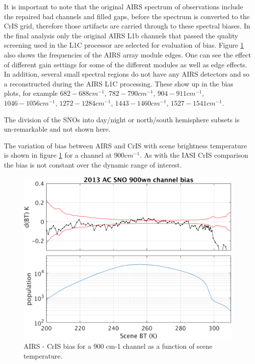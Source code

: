 \documentclass[11pt]{article}
\begin{document}


It is important to note that the original AIRS spectrum of observations include the repaired bad channels and filled gaps, before the spectrum is converted to the CrIS grid, therefore those artifacts are carried through to these spectral biases. In the final analysis only the original AIRS L1b channels that passed the quality screening used in the L1C processor are selected for evaluation of bias. Figure \ref{fig:Y6} also shows the frequencies of the AIRS array module edges. One can see the effect of different gain settings for some of the different modules as well as edge effects. In addition, several small spectral regions do not have any AIRS detectors and so a reconstructed during the AIRS L1C processing. These show up in the bias plots, for example $ 682 - 688 cm^{-1} $, $ 782 - 790 cm^{-1} $, $ 904 - 911 cm^{-1} $, $ 1046 - 1056 cm^{-1} $, $ 1272 - 1284 cm^{-1} $, $ 1443 - 1460 cm^{-1} $, $ 1527 - 1541 cm^{-1} $.

The division of the SNOs into day/night or north/south hemisphere subsets is un-remarkable and not shown here.

The variation of bias between AIRS and CrIS with scene brightness temperature is shown in figure \ref{fig:Y6} for a channel at $ 900 cm^{-1} $. As with the IASI CrIS comparison the bias is not constant over the dynamic range of interest.

\begin{figure}[htb]
\centering
\includegraphics[width=.6\linewidth]{./figs/AC_SNO_2013_900wn_bias_vs_scene.png}
\caption{\label{fig:orgparagraph18}
  AIRS - CrIS bias for a 900 cm-1 channel as a function of scene temperature.}
\label{fig:Y6}
\end{figure}
\end{document}
